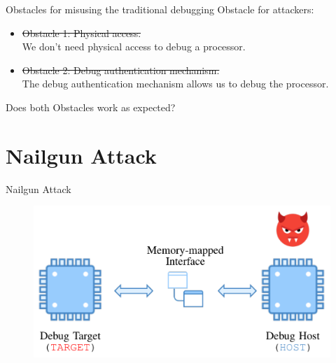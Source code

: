 \documentclass{beamer}
\begin{document}
\begin{frame}{Obstacles for misusing the traditional debugging}
    Obstacle for attackers:
    \begin{itemize}
        \item \sout{Obstacle 1: Physical access.}\\ We don't need physical access to debug a processor.
        \item \sout{Obstacle 2: Debug authentication mechanism.}\\ The debug authentication mechanism allows us to debug the processor.
    \end{itemize}
    Does both Obstacles work as expected?
\end{frame}

\section{Nailgun Attack}

\begin{frame}{Nailgun Attack}
    \begin{figure}
        \centering
        \includegraphics[scale=.40]{SUSTech-Beamer-Theme/pic/Nailgun1.png}
        \label{fig:my_label}
    \end{figure}
\end{frame}
\end{document}
